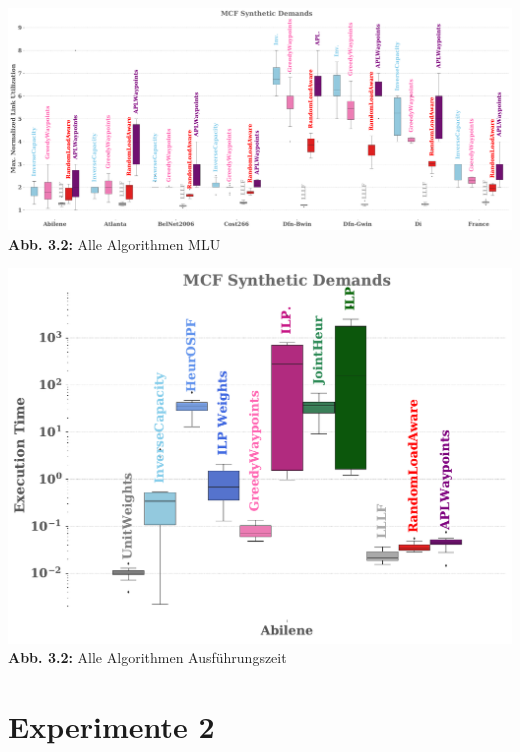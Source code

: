 \begin{center}
        \centering
        \includegraphics[width=\textwidth]{Report/bilder/RLAPS/all_topologies_objective_mlu_0.pdf}
        \small\textbf{Abb. 3.2:} Alle Algorithmen MLU
        \label{fig:enter-label}
\end{center}

\begin{center}
        \centering
        \includegraphics[width=\textwidth]{Report/bilder/RLAPS/all_algorithms_abilene_execution_time.pdf}
        \small\textbf{Abb. 3.2:} Alle Algorithmen Ausführungszeit
        \label{fig:enter-label}
\end{center}

\section{Experimente 2}

